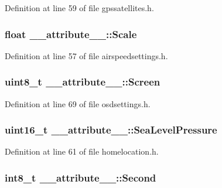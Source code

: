 \-Definition at line 59 of file gpssatellites.\-h.

\hypertarget{struct____attribute_____a30861efde2efd783124dbeb7e1725023}{
\subsubsection[{\-Scale}]{\setlength{\rightskip}{0pt plus 5cm}float {\bf \-\_\-\-\_\-attribute\-\_\-\-\_\-\-::\-Scale}}}\label{struct____attribute_____a30861efde2efd783124dbeb7e1725023}


\-Definition at line 57 of file airspeedsettings.\-h.

\hypertarget{struct____attribute_____a1d2c9fe6d7cc715b0f794413accd17d3}{
\subsubsection[{\-Screen}]{\setlength{\rightskip}{0pt plus 5cm}uint8\-\_\-t {\bf \-\_\-\-\_\-attribute\-\_\-\-\_\-\-::\-Screen}}}\label{struct____attribute_____a1d2c9fe6d7cc715b0f794413accd17d3}


\-Definition at line 69 of file osdsettings.\-h.

\hypertarget{struct____attribute_____a87e877a9d87bf2748f3d028f6d28bd91}{
\subsubsection[{\-Sea\-Level\-Pressure}]{\setlength{\rightskip}{0pt plus 5cm}uint16\-\_\-t {\bf \-\_\-\-\_\-attribute\-\_\-\-\_\-\-::\-Sea\-Level\-Pressure}}}\label{struct____attribute_____a87e877a9d87bf2748f3d028f6d28bd91}


\-Definition at line 61 of file homelocation.\-h.

\hypertarget{struct____attribute_____ade1e5256a6912b5b3c34bc1892a2049b}{
\subsubsection[{\-Second}]{\setlength{\rightskip}{0pt plus 5cm}int8\-\_\-t {\bf \-\_\-\-\_\-attribute\-\_\-\-\_\-\-::\-Second}}}\label{struct____attribute_____ade1e5256a6912b5b3c34bc1892a2049b}


